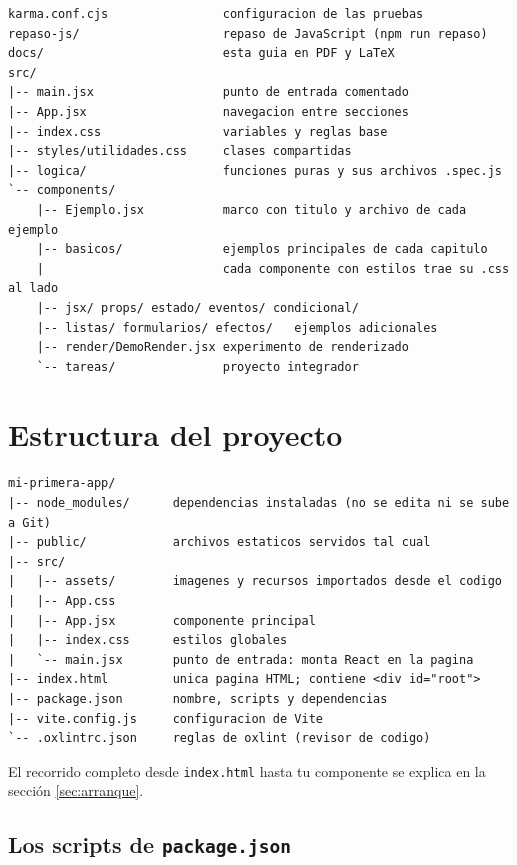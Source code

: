 \documentclass[11pt,a4paper]{article}
\newcommand{\cmd}[1]{\texttt{\color{reactdark}#1}}
\begin{document}
\begin{lstlisting}[language={},numbers=none]
karma.conf.cjs                configuracion de las pruebas
repaso-js/                    repaso de JavaScript (npm run repaso)
docs/                         esta guia en PDF y LaTeX
src/
|-- main.jsx                  punto de entrada comentado
|-- App.jsx                   navegacion entre secciones
|-- index.css                 variables y reglas base
|-- styles/utilidades.css     clases compartidas
|-- logica/                   funciones puras y sus archivos .spec.js
`-- components/
    |-- Ejemplo.jsx           marco con titulo y archivo de cada ejemplo
    |-- basicos/              ejemplos principales de cada capitulo
    |                         cada componente con estilos trae su .css al lado
    |-- jsx/ props/ estado/ eventos/ condicional/
    |-- listas/ formularios/ efectos/   ejemplos adicionales
    |-- render/DemoRender.jsx experimento de renderizado
    `-- tareas/               proyecto integrador
\end{lstlisting}

\section{Estructura del proyecto}

\begin{lstlisting}[language={},numbers=none]
mi-primera-app/
|-- node_modules/      dependencias instaladas (no se edita ni se sube a Git)
|-- public/            archivos estaticos servidos tal cual
|-- src/
|   |-- assets/        imagenes y recursos importados desde el codigo
|   |-- App.css
|   |-- App.jsx        componente principal
|   |-- index.css      estilos globales
|   `-- main.jsx       punto de entrada: monta React en la pagina
|-- index.html         unica pagina HTML; contiene <div id="root">
|-- package.json       nombre, scripts y dependencias
|-- vite.config.js     configuracion de Vite
`-- .oxlintrc.json     reglas de oxlint (revisor de codigo)
\end{lstlisting}

El recorrido completo desde \cmd{index.html} hasta tu componente se explica en la sección \ref{sec:arranque}.

\subsection{Los scripts de \texttt{package.json}}
\end{document}
